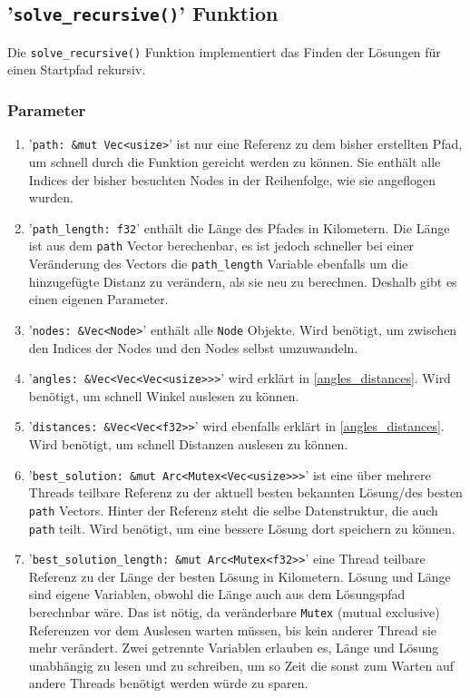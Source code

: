 \documentclass[a4paper,10pt,ngerman]{scrartcl}
\begin{document}
\subsection{’\lstinline{solve_recursive()}’ Funktion}
Die \lstinline{solve_recursive()} Funktion implementiert das Finden der Lösungen für einen Startpfad rekursiv.
\subsubsection{Parameter}
\begin{enumerate}
    \item ’\lstinline{path: &mut Vec<usize>}’ ist nur eine Referenz zu dem bisher erstellten Pfad, um schnell durch die Funktion gereicht werden zu können. Sie enthält alle Indices der bisher besuchten Nodes in der Reihenfolge, wie sie angeflogen wurden.  
    \item '\lstinline{path_length: f32}' enthält die Länge des Pfades in Kilometern. Die Länge ist aus dem \lstinline{path} Vector berechenbar, es ist jedoch schneller bei einer Veränderung des Vectors die \lstinline{path_length} Variable ebenfalls um die hinzugefügte Distanz zu verändern, als sie neu zu berechnen. Deshalb gibt es einen eigenen Parameter.
    \item '\lstinline{nodes: &Vec<Node>}' enthält alle \lstinline{Node} Objekte. Wird benötigt, um zwischen den Indices der Nodes und den Nodes selbst umzuwandeln. 
    \item '\lstinline{angles: &Vec<Vec<Vec<usize>>>}' wird erklärt in \ref{angles_distances}. Wird benötigt, um schnell Winkel auslesen zu können.
    \item '\lstinline{distances: &Vec<Vec<f32>>}' wird ebenfalls erklärt in \ref{angles_distances}. Wird benötigt, um schnell Distanzen auslesen zu können.
    \item '\lstinline{best_solution: &mut Arc<Mutex<Vec<usize>>>}' ist eine über mehrere Threads teilbare Referenz zu der aktuell besten bekannten Lösung/des besten \lstinline{path} Vectors. Hinter der Referenz steht die selbe Datenstruktur, die auch \lstinline{path} teilt. Wird benötigt, um eine bessere Lösung dort speichern zu können.
    \item '\lstinline{best_solution_length: &mut Arc<Mutex<f32>>}' eine Thread teilbare Referenz zu der Länge der besten Lösung in Kilometern. Lösung und Länge sind eigene Variablen, obwohl die Länge auch aus dem Lösungspfad berechnbar wäre. Das ist nötig, da veränderbare \lstinline{Mutex} (mutual exclusive) Referenzen vor dem Auslesen warten müssen, bis kein anderer Thread sie mehr verändert. Zwei getrennte Variablen erlauben es, Länge und Lösung unabhängig zu lesen und zu schreiben, um so Zeit die sonst zum Warten auf andere Threads benötigt werden würde zu sparen.  

\end{enumerate}
\end{document}
